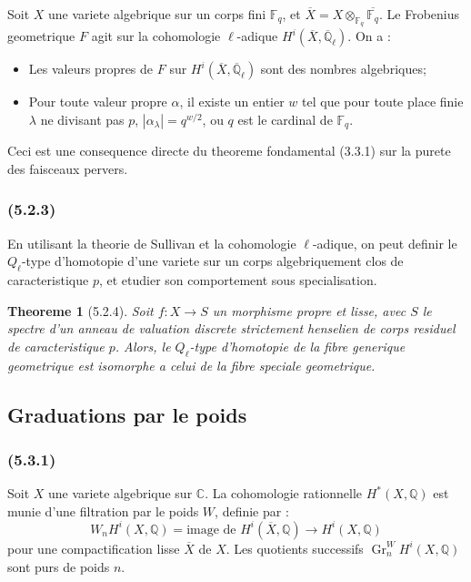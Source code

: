 \documentclass[12pt,a4paper]{article}
\theoremstyle{plain}
\newtheorem{theorem}{Theoreme}[section]
\theoremstyle{definition}
\theoremstyle{remark}
\DeclareMathOperator{\Gr}{Gr}
\newcommand{\bbQ}{\mathbb{Q}}
\newcommand{\bbC}{\mathbb{C}}
\newcommand{\Qlb}{\overline{\mathbb{Q}}_\ell}
\newcommand{\Fqt}{\mathbb{F}_q}
\begin{document}
Soit $X$ une variete algebrique sur un corps fini $\Fqt$, et $\overline{X} = X \otimes_{\Fqt} \overline{\Fqt}$. Le Frobenius geometrique $F$ agit sur la cohomologie $\ell$-adique $H^i(\overline{X}, \Qlb)$. On a :
\begin{itemize}
\item[(i)] Les valeurs propres de $F$ sur $H^i(\overline{X}, \Qlb)$ sont des nombres algebriques;
\item[(ii)] Pour toute valeur propre $\alpha$, il existe un entier $w$ tel que pour toute place finie $\lambda$ ne divisant pas $p$, $|\alpha_\lambda| = q^{w/2}$, ou $q$ est le cardinal de $\Fqt$.
\end{itemize}

Ceci est une consequence directe du theoreme fondamental (3.3.1) sur la purete des faisceaux pervers.

\subsubsection*{\textup{(5.2.3)}}

En utilisant la theorie de Sullivan et la cohomologie $\ell$-adique, on peut definir le $Q_\ell$-type d'homotopie d'une variete sur un corps algebriquement clos de caracteristique $p$, et etudier son comportement sous specialisation.

\begin{theorem}[5.2.4]
Soit $f : X \to S$ un morphisme propre et lisse, avec $S$ le spectre d'un anneau de valuation discrete strictement henselien de corps residuel de caracteristique $p$. Alors, le $Q_\ell$-type d'homotopie de la fibre generique geometrique est isomorphe a celui de la fibre speciale geometrique.
\end{theorem}

\subsection{Graduations par le poids}

\subsubsection*{\textup{(5.3.1)}}

Soit $X$ une variete algebrique sur $\bbC$. La cohomologie rationnelle $H^*(X, \bbQ)$ est munie d'une filtration par le poids $W$, definie par :
\[
W_n H^i(X, \bbQ) = \text{image de } H^i(\overline{X}, \bbQ) \to H^i(X, \bbQ)
\]
pour une compactification lisse $\overline{X}$ de $X$. Les quotients successifs $\Gr^W_n H^i(X, \bbQ)$ sont purs de poids $n$.
\end{document}
